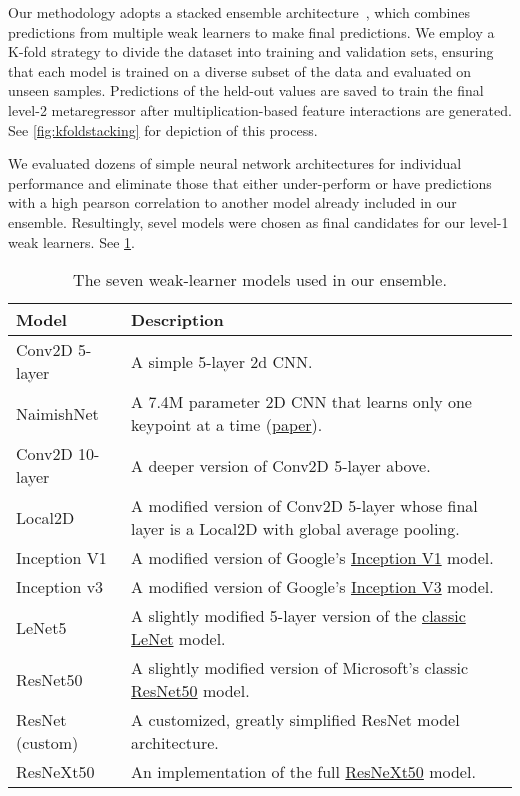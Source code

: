 Our methodology adopts a stacked ensemble architecture~\cite{WOLPERT1992241}, which combines predictions from multiple weak learners to make final predictions. We employ a K-fold strategy to divide the dataset into training and validation sets, ensuring that each model is trained on a diverse subset of the data and evaluated on unseen samples. Predictions of the held-out values are saved to train the final level-2 metaregressor after multiplication-based feature interactions are generated.  See \cref{fig:kfoldstacking} for depiction of this process.

We evaluated dozens of simple neural network architectures for individual performance and eliminate those that either under-perform or have predictions with a high pearson correlation to another model already included in our ensemble. Resultingly, sevel models were chosen as final candidates for our level-1 weak learners.  See \cref{tab:sevenmodels}.

\begin{table}
	\raggedright
	\centering
	\small
	\begin{tabular}{p{2.3cm}|p{5.7cm}}
		\toprule
		\textbf{Model} & \textbf{Description} \\
		\midrule
		Conv2D 5-layer & A simple 5-layer 2d CNN. \\
		\midrule
		NaimishNet & A 7.4M parameter 2D CNN that learns only one keypoint at a time (\href{https://arxiv.org/abs/1710.00977}{paper}). \\
		\midrule
		Conv2D 10-layer & A deeper version of Conv2D 5-layer above. \\
		\midrule
		Local2D & A modified version of Conv2D 5-layer whose final layer is a Local2D with global average pooling. \\
		\midrule
		Inception V1 & A modified version of Google's \href{https://arxiv.org/abs/1409.4842}{Inception V1} model. \\
		\midrule
		Inception v3 & A modified version of Google's \href{https://arxiv.org/abs/1512.00567}{Inception V3} model. \\
		\midrule
		LeNet5 & A slightly modified 5-layer version of the \href{http://vision.stanford.edu/cs598_spring07/papers/Lecun98.pdf}{classic LeNet} model. \\
		\midrule
		ResNet50 & A slightly modified version of Microsoft's classic \href{https://arxiv.org/abs/1512.03385}{ResNet50} model. \\
		\midrule
		ResNet (custom) & A customized, greatly simplified ResNet model architecture. \\
		\midrule
		ResNeXt50 & An implementation of the full \href{https://arxiv.org/abs/1611.05431}{ResNeXt50} model. \\
		\bottomrule
	\end{tabular}
	\caption{The seven weak-learner models used in our ensemble.}
	\label{tab:sevenmodels}
\end{table}

